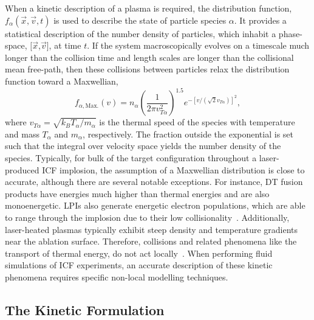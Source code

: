 When a kinetic description of a plasma is required, the distribution function, $f_{\alpha}(\vec{x},\vec{v},t)$ is used to describe the state of particle species $\alpha$.
It provides a statistical description of the number density of particles, which inhabit a phase-space, $[\vec{x}$,$\vec{v}]$, at time $t$.
If the system macroscopically evolves on a timescale much longer than the collision time and length scales are longer than the collisional mean free-path, then these collisions between particles relax the distribution function toward a Maxwellian,
\begin{equation}
    \label{eq:theory_maxwellian}
    f_{\alpha,\text{Max.}}(v) = n_{\alpha} {\left( \frac{1}{2\pi v_{T\alpha}^2} \right)}^{1.5} e^{-\left [ v/ \left (\sqrt{2} v_{T\alpha} \right ) \right ]^2},
\end{equation}
where $v_{T\alpha}=\sqrt{k_B T_{\alpha}/m_{\alpha}}$ is the thermal speed of the species with temperature and mass $T_{\alpha}$ and $m_{\alpha}$, respectively.
The fraction outside the exponential is set such that the integral over velocity space yields the number density of the species.
Typically, for bulk of the target configuration throughout a laser-produced \ac{ICF} implosion, the assumption of a Maxwellian distribution is close to accurate, although there are several notable exceptions.
For instance, DT fusion products have energies much higher than thermal energies and are also monoenergetic.
\ac{LPIs} also generate energetic electron populations, which are able to range through the implosion due to their low collisionality~\cite{barlow_role_2022}.
Additionally, laser-heated plasmas typically exhibit steep density and temperature gradients near the ablation surface.
Therefore, collisions and related phenomena like the transport of thermal energy, do not act locally~\cite{epperlein_practical_1991}.
When performing fluid simulations of \ac{ICF} experiments, an accurate description of these kinetic phenomena requires specific non-local modelling techniques.

\subsection{The Kinetic Formulation}%
\label{sec:theory_vlasov}

